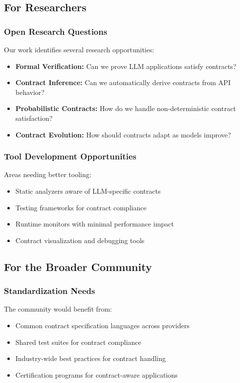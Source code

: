 \documentclass[11pt]{article}
\begin{document}
\subsection{For Researchers}

\subsubsection{Open Research Questions}
Our work identifies several research opportunities:
\begin{itemize}
    \item \textbf{Formal Verification:} Can we prove LLM applications satisfy contracts?
    \item \textbf{Contract Inference:} Can we automatically derive contracts from API behavior?
    \item \textbf{Probabilistic Contracts:} How do we handle non-deterministic contract satisfaction?
    \item \textbf{Contract Evolution:} How should contracts adapt as models improve?
\end{itemize}

\subsubsection{Tool Development Opportunities}
Areas needing better tooling:
\begin{itemize}
    \item Static analyzers aware of LLM-specific contracts
    \item Testing frameworks for contract compliance
    \item Runtime monitors with minimal performance impact
    \item Contract visualization and debugging tools
\end{itemize}

\subsection{For the Broader Community}

\subsubsection{Standardization Needs}
The community would benefit from:
\begin{itemize}
    \item Common contract specification languages across providers
    \item Shared test suites for contract compliance
    \item Industry-wide best practices for contract handling
    \item Certification programs for contract-aware applications
\end{itemize}
\end{document}
